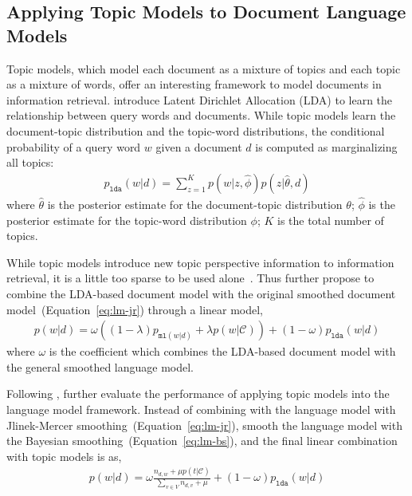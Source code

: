 
\subsection{Applying Topic Models to Document Language Models}

Topic models, which model each document as a mixture of topics and each topic as a mixture of words, offer an interesting framework to model documents in information retrieval. \cite{wei-06} introduce Latent Dirichlet Allocation (LDA) to learn the relationship between query words and documents. While topic models learn the document-topic distribution and the topic-word distributions, the conditional probability of a query word $w$ given a document $d$ is computed as marginalizing all topics:
\begin{align}
p_{\texttt{lda}}(w|d) = \sum_{z=1}^K p(w|z, \hat{\phi}) p(z | \hat{\theta}, d)
\end{align}
where $\hat{\theta}$ is the posterior estimate for the document-topic distribution $\theta$; $\hat{\phi}$ is the posterior estimate for the topic-word distribution $\phi$; $K$ is the total number of topics.

While topic models introduce new topic perspective information to information retrieval, it is a little too sparse to be used alone~\citep{wei-06}. Thus \cite{wei-06} further propose to combine the LDA-based document model with the original smoothed document model~(Equation~\ref{eq:lm-jr}) through a linear model,
\begin{align}
p(w|d) = \omega ((1 - \lambda) p_{\texttt{ml}(w|d)} + \lambda p(w|\mathcal{C})) + (1 - \omega) p_{\texttt{lda}}(w|d)
\end{align}
where $\omega$ is the coefficient which combines the LDA-based document model with the general smoothed language model.

Following \cite{wei-06}, \cite{Lu-2011} further evaluate the performance of applying topic models into the language model framework. Instead of combining with the language model with Jlinek-Mercer smoothing~(Equation~\ref{eq:lm-jr}), \cite{Lu-2011} smooth the language model with the Bayesian smoothing~(Equation~\ref{eq:lm-bs}), and the final linear combination with topic models is as,
\begin{align}
p(w|d) = \omega \frac{n_{d,w} + \mu p(t|\mathcal{C})}{\sum_{v \in V} n_{d,v} + \mu}  + (1 - \omega) p_{\texttt{lda}}(w|d)
\end{align}

